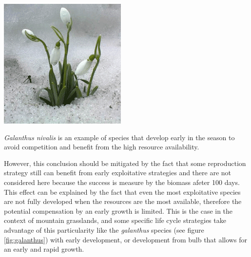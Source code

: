 \begin{marginfigure}
\includegraphics[scale=1]{./2_PP/Figures/Variable/GalanthusNivalis.png}
\caption[\textit{Galanthus nivalis}]{\textit{Galanthus nivalis} is an example of species that develop early in the season to avoid competition and benefit from the high resource availability.}
\end{marginfigure}

However, this conclusion should be mitigated by the fact that some reproduction strategy still can benefit from early exploitative strategies and there are not considered here because the success is measure by the biomass afeter 100 days. This effect can be explained by the fact that even the most exploitative species are not fully developed when the resources are the most available, therefore the potential compensation by an early growth is limited. This is the case in the context of mountain grasslands, and some specific life cycle strategies take advantage of this particularity like the \textit{galanthus} species (see figure \ref{fig:galanthus}) with early development\parencite{schroder_modelling_2014}, or development from bulb that allows for an early and rapid growth.

